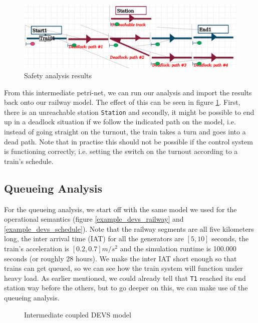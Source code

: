 \documentclass{article}
\begin{document}
\begin{figure}[H]
    \centering
    \includegraphics[width=\textwidth]{images/example_pn_results.png}
    \caption{Safety analysis results}
    \label{example_pn_results}
\end{figure}

From this intermediate petri-net, we can run our analysis and import the results back onto our railway model. The effect of this can be seen in figure \ref{example_pn_results}. First, there is an unreachable station \texttt{Station} and secondly, it might be possible to end up in a deadlock situation if we follow the indicated path on the model, i.e. instead of going straight on the turnout, the train takes a turn and goes into a dead path. Note that in practise this should not be possible if the control system is functioning correctly, i.e. setting the switch on the turnout according to a train's schedule.

\subsection*{Queueing Analysis}
\label{queueing_analysis_section}

For the queueing analysis, we start off with the same model we used for the operational semantics (figure \ref{example_devs_railway} and \ref{example_devs_schedule}). Note that the railway segments are all five kilometers long, the inter arrival time (IAT) for all the generators are $[5,10]$ seconds, the train's acceleration is $[0.2,0.7] m/s^2$ and the simulation runtime is 100.000 seconds (or roughly 28 hours). We make the inter IAT short enough so that trains can get queued, so we can see how the train system will function under heavy load. As earlier mentioned, we could already tell that \texttt{T1} reached its end station way before the others, but to go deeper on this, we can make use of the queueing analysis.

\begin{figure}[H]
    \begin{center}
    \end{center}
    \caption{Intermediate coupled DEVS model}
    \label{example_devs_devs}
\end{figure}
\end{document}
